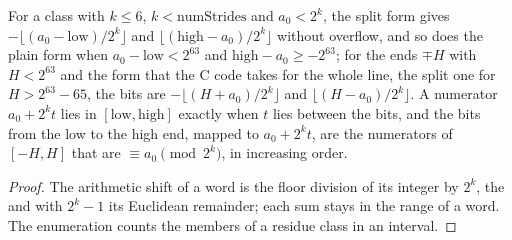 \begin{lemma}\label{lem:numeratorsToBits}
  \leanok
  For a class with $k \le 6$, $k < \mathrm{numStrides}$ and $a_0 < 2^k$, the split form gives
  $-\lfloor(a_0 - \mathrm{low})/2^k\rfloor$ and $\lfloor(\mathrm{high} - a_0)/2^k\rfloor$ without
  overflow, and so does the plain form when $a_0 - \mathrm{low} < 2^{63}$ and
  $\mathrm{high} - a_0 \ge -2^{63}$; for the ends $\mp H$ with $H < 2^{63}$ and the form that the C
  code takes for the whole line, the split one for $H > 2^{63} - 65$, the bits are
  $-\lfloor (H + a_0)/2^k\rfloor$ and $\lfloor (H - a_0)/2^k\rfloor$. A numerator $a_0 + 2^k t$ lies
  in $[\mathrm{low}, \mathrm{high}]$ exactly when $t$ lies between the bits, and the bits from the
  low to the high end, mapped to $a_0 + 2^k t$, are the numerators of $[-H, H]$ that are
  $\equiv a_0 \pmod{2^k}$, in increasing order.
\end{lemma}

\begin{proof}
  \leanok
  The arithmetic shift of a word is the floor division of its integer by $2^k$, the and with
  $2^k - 1$ its Euclidean remainder; each sum stays in the range of a word. The enumeration counts
  the members of a residue class in an interval.
\end{proof}

